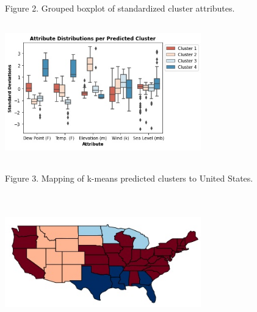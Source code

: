 \documentclass[conference]{IEEEtran}
\begin{document}
Figure 2. Grouped boxplot of standardized cluster attributes.

\includegraphics[width=8.5cm, height=6cm]{attribute_distribution.jpg}

Figure 3. Mapping of k-means predicted clusters to United States.

\includegraphics[width=8.5cm, height=6cm]{cluster_on_map.jpg}
\end{document}
